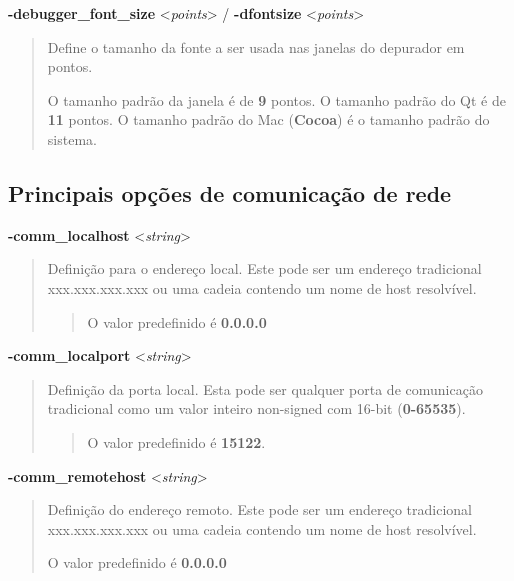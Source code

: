 \documentclass[letterpaper,10pt,brazil]{sphinxmanual}
\begin{document}
\label{commandline/commandline-all:mame-commandline-debuggerfontsize}
\textbf{-debugger\_font\_size} \textless{}\emph{points}\textgreater{} / \textbf{-dfontsize} \textless{}\emph{points}\textgreater{}
\begin{quote}

Define o tamanho da fonte a ser usada nas janelas do depurador
em pontos.

O tamanho padrão da janela é de \textbf{9} pontos.
O tamanho padrão do Qt é de \textbf{11} pontos.
O tamanho padrão do Mac (\textbf{Cocoa}) é o tamanho padrão do sistema.
\end{quote}


\subsection{Principais opções de comunicação de rede}
\label{commandline/commandline-all:principais-opcoes-de-comunicacao-de-rede}\label{commandline/commandline-all:mame-commandline-commlocalhost}
\textbf{-comm\_localhost} \textless{}\emph{string}\textgreater{}
\begin{quote}

Definição para o endereço local. Este pode ser um endereço
tradicional xxx.xxx.xxx.xxx ou uma cadeia contendo um nome de host
resolvível.
\begin{quote}

O valor predefinido é \textbf{0.0.0.0}
\end{quote}
\end{quote}
\label{commandline/commandline-all:mame-commandline-commlocalport}
\textbf{-comm\_localport} \textless{}\emph{string}\textgreater{}
\begin{quote}

Definição da porta local. Esta pode ser qualquer porta de
comunicação tradicional como um valor inteiro non-signed com 16-bit
(\textbf{0-65535}).
\begin{quote}

O valor predefinido é \textbf{15122}.
\end{quote}
\end{quote}
\label{commandline/commandline-all:mame-commandline-commremotehost}
\textbf{-comm\_remotehost} \textless{}\emph{string}\textgreater{}
\begin{quote}

Definição do endereço remoto. Este pode ser um endereço tradicional
xxx.xxx.xxx.xxx ou uma cadeia contendo um nome de host resolvível.

O valor predefinido é \textbf{0.0.0.0}
\end{quote}
\end{document}
